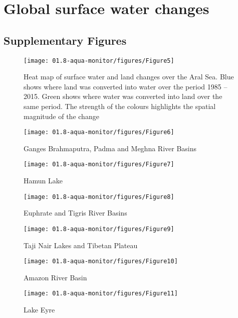 \chapter{Global surface water changes}

\newpage

\section{Supplementary Figures}

\begin{figure}
	\centering
	\texttt{[image: 01.8-aqua-monitor/figures/Figure5]}
	\caption{Heat map of surface water and land changes over the Aral Sea. Blue shows where land was converted into water over the period 1985 – 2015. Green shows where water was converted into land over the same period. The strength of the colours highlights the spatial magnitude of the change}
\end{figure}

\begin{figure}
	\centering
	\texttt{[image: 01.8-aqua-monitor/figures/Figure6]}
	\caption{Ganges Brahmaputra, Padma and Meghna River Basins}
\end{figure}

\begin{figure}
	\centering
	\texttt{[image: 01.8-aqua-monitor/figures/Figure7]}
	\caption{Hamun Lake}
\end{figure}

\begin{figure}
	\centering
	\texttt{[image: 01.8-aqua-monitor/figures/Figure8]}
	\caption{Euphrate and Tigris River Basins}
\end{figure}

\begin{figure}
	\centering
	\texttt{[image: 01.8-aqua-monitor/figures/Figure9]}
	\caption{Taji Nair Lakes and Tibetan Plateau}
\end{figure}

\begin{figure}
	\centering
	\texttt{[image: 01.8-aqua-monitor/figures/Figure10]}
	\caption{Amazon River Basin}
\end{figure}

\begin{figure}
	\centering
	\texttt{[image: 01.8-aqua-monitor/figures/Figure11]}
	\caption{Lake Eyre}
\end{figure}

